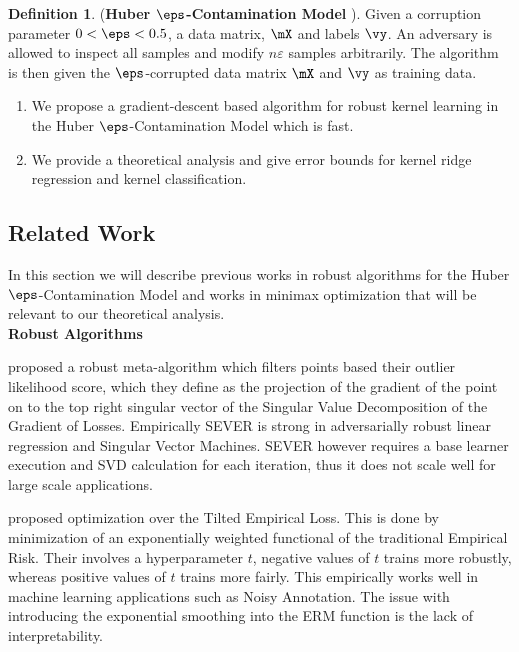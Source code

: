 \documentclass{article} %
\theoremstyle{plain}
\theoremstyle{definition}
\newtheorem{definition}[thm]{Definition}
\theoremstyle{remark}
\begin{document}
	\begin{definition}
		(\textbf{Huber $\mathbf{\eps}$-Contamination Model} \cite{huber:2009}). Given a corruption parameter $0 < \eps < 0.5$, a data matrix, $\mX$ and labels $\vy$. An adversary is allowed to inspect all samples and modify $n\varepsilon$ samples arbitrarily. The algorithm is then given the $\eps$-corrupted data matrix $\mX$ and $\vy$ as training data. 
	\end{definition}

	\begin{enumerate}
		\item We propose a gradient-descent based algorithm for robust kernel learning in the Huber $\eps$-Contamination Model which is fast. 
		\item We provide a theoretical analysis and give error bounds for kernel ridge regression and kernel classification. 
	\end{enumerate}
	
	\subsection{Related Work}
	In this section we will describe previous works in robust algorithms for the Huber $\eps$-Contamination Model and works in minimax optimization that will be relevant to our theoretical analysis. \\
	\noindent\textbf{Robust Algorithms}
	
	\citep{diakonikolas:2019} proposed a robust meta-algorithm which filters points based their outlier likelihood score, which they define as the projection of the gradient of the point on to the top right singular vector of the Singular Value Decomposition of the Gradient of Losses. Empirically SEVER is strong in adversarially robust linear regression and Singular Vector Machines. SEVER however requires a base learner execution and SVD calculation for each iteration, thus it does not scale well for large scale applications. 
	
	\citep{li:2021} proposed optimization over the Tilted Empirical Loss. This is done by minimization of an exponentially weighted functional of the traditional Empirical Risk. Their involves a hyperparameter $t$, negative values of $t$ trains more robustly, whereas positive values of $t$ trains more fairly. This empirically works well in machine learning applications such as Noisy Annotation. The issue with introducing the exponential smoothing into the ERM function is the lack of interpretability.
	
\end{document}
